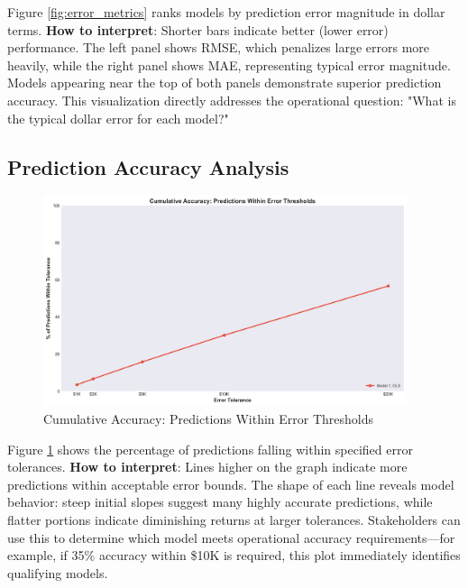Figure \ref{fig:error_metrics} ranks models by prediction error magnitude in dollar terms. \textbf{How to interpret}: Shorter bars indicate better (lower error) performance. The left panel shows RMSE, which penalizes large errors more heavily, while the right panel shows MAE, representing typical error magnitude. Models appearing near the top of both panels demonstrate superior prediction accuracy. This visualization directly addresses the operational question: "What is the typical dollar error for each model?"

\subsection{Prediction Accuracy Analysis}

\begin{figure}[h!]
\centering
\includegraphics[width=0.95\textwidth]{figures/plot_d_cumulative_accuracy.png}
\caption{Cumulative Accuracy: Predictions Within Error Thresholds}
\label{fig:cumulative_accuracy}
\end{figure}

Figure \ref{fig:cumulative_accuracy} shows the percentage of predictions falling within specified error tolerances. \textbf{How to interpret}: Lines higher on the graph indicate more predictions within acceptable error bounds. The shape of each line reveals model behavior: steep initial slopes suggest many highly accurate predictions, while flatter portions indicate diminishing returns at larger tolerances. Stakeholders can use this to determine which model meets operational accuracy requirements—for example, if 35\% accuracy within \$10K is required, this plot immediately identifies qualifying models.

